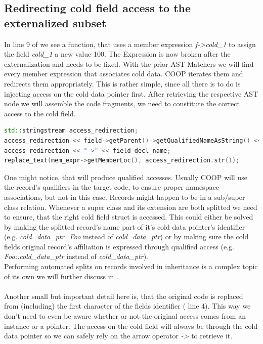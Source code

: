 \subsection{Redirecting cold field access to the externalized subset}
In line 9 of  we see a function, that uses a member expression \textit{f->cold\_1} to assign the field \textit{cold\_1} a new value 100. The Expression is now broken after the externalization and needs to be fixed. With the prior AST Matchers we will find every member expression that associates cold data. COOP iterates them and redirects them appropriately. This is rather simple, since all there is to do is injecting access on the cold data pointer first. After retrieving the respective AST node we will assemble the code fragments, we need to constitute the correct access to the cold field.\\
\begin{lstlisting}[language=C++, name={Assembling the proper access ot a cold field through the additional indirection.}, label={redirect_assembly}, morekeywords={stringstream, std}]
std::stringstream access_redirection;
access_redirection << field->getParent()->getQualifiedNameAsString() << "::";
access_redirection << "->" << field_decl_name;
replace_text(mem_expr->getMemberLoc(), access_redirection.str());
\end{lstlisting}
One might notice, that  will produce qualified accesses. Usually COOP will use the record's qualifiers in the target code, to ensure proper namespace associations, but not in this case. Records might happen to be in a sub/super class relation. Whenever a super class and its extension are both splitted we need to ensure, that the right cold field struct is accessed. This could either be solved by making the splitted record's name part of it's cold data pointer's identifier (e.g. \textit{cold\_data\_ptr\_Foo} instead of \textit{cold\_data\_ptr}) or by making sure the cold fields original record's affiliation is expressed through qualified access (e.g. \textit{Foo::cold\_data\_ptr} instead of \textit{cold\_data\_ptr}).\\
Performing automated splits on records involved in inheritance is a complex topic of its own we will further discuss in .\\\\
Another small but important detail here is, that the original code is replaced from (including) the first character of the fields identifier ( line 4). This way we don't need to even be aware whether or not the original access comes from an instance or a pointer. The access on the cold field will always be through the cold data pointer so we can safely rely on the arrow operator \textit{->} to retrieve it.

